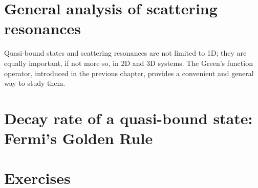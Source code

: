 \documentclass[pra,12pt]{revtex4}
\begin{document}
\section{General analysis of scattering resonances}

Quasi-bound states and scattering resonances are not limited to 1D;
they are equally important, if not more so, in 2D and 3D systems.  The
Green's function operator, introduced in the previous chapter,
provides a convenient and general way to study them.



\section{Decay rate of a quasi-bound state: Fermi's Golden Rule}


\section*{Exercises}
\end{document}
